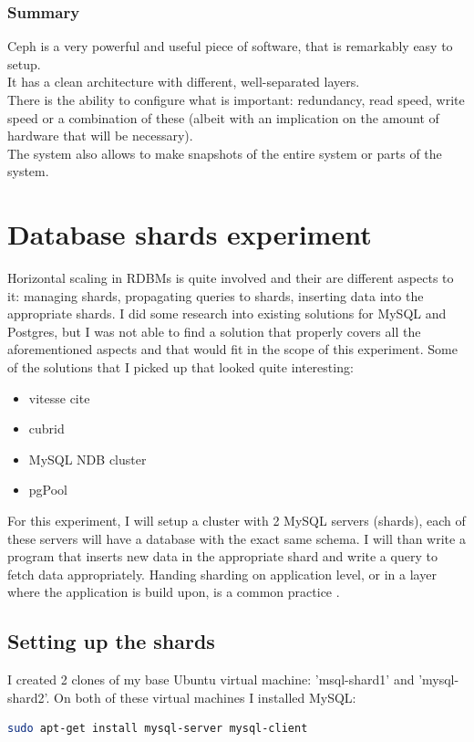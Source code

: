 \documentclass[12pt]{report}
\begin{document}
\subsubsection{Summary}
Ceph is a very powerful and useful piece of software, that is
remarkably easy to setup.\\
It has a clean architecture with different, well-separated layers.\\
There is the ability to configure what is important: redundancy, read
speed, write speed or a combination of these (albeit with an
implication on the amount of hardware that will be necessary).\\
The system also allows to make snapshots of the entire system or parts
of the system.

\section{Database shards experiment}
Horizontal scaling in RDBMs is quite involved and their are different
aspects to it: managing shards, propagating queries to shards,
inserting data into the appropriate shards.
I did some research into existing solutions for MySQL and Postgres, but
I was not able to find a solution that properly covers all the
aforementioned aspects and that would fit in the scope of this
experiment.
Some of the solutions that I picked up that looked quite interesting:
\begin{itemize}
\item vitesse cite
\item cubrid
\item MySQL NDB cluster
\item pgPool
\end{itemize}

For this experiment, I will setup a cluster with 2 MySQL servers (shards), each
of these servers will have a database with the exact same schema. I will
than write a program that inserts new data in the appropriate shard
and write a query to fetch data appropriately.
Handing sharding on application level, or in a layer where the
application is build upon, is a common practice
\cite{tumblr_sharding}. 

\subsection{Setting up the shards}
I created 2 clones of my base Ubuntu virtual machine: 'msql-shard1'
and 'mysql-shard2'. 
On both of these virtual machines I installed MySQL:
\begin{lstlisting}[language=bash]
sudo apt-get install mysql-server mysql-client
\end{lstlisting}
\end{document}
